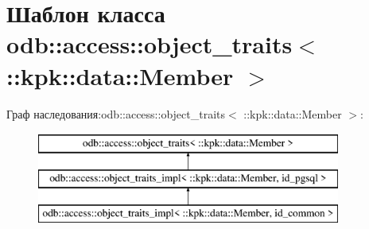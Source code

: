 \hypertarget{classodb_1_1access_1_1object__traits_3_01_1_1kpk_1_1data_1_1_member_01_4}{}\section{Шаблон класса odb\+:\+:access\+:\+:object\+\_\+traits$<$ \+:\+:kpk\+:\+:data\+:\+:Member $>$}
\label{classodb_1_1access_1_1object__traits_3_01_1_1kpk_1_1data_1_1_member_01_4}
Граф наследования\+:odb\+:\+:access\+:\+:object\+\_\+traits$<$ \+:\+:kpk\+:\+:data\+:\+:Member $>$\+:\begin{figure}[H]
\begin{center}
\leavevmode
\includegraphics[height=3.000000cm]{classodb_1_1access_1_1object__traits_3_01_1_1kpk_1_1data_1_1_member_01_4}
\end{center}
\end{figure}

